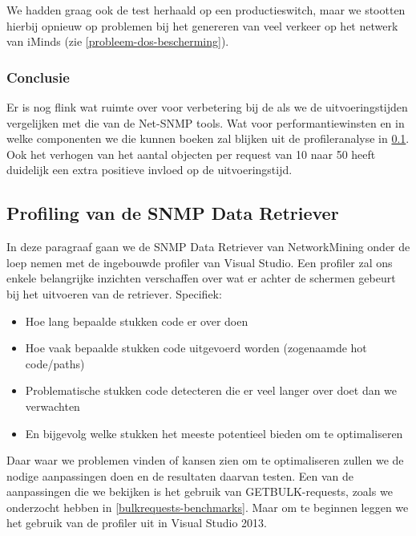We hadden graag ook de test herhaald op een productieswitch,
maar we stootten hierbij opnieuw op problemen bij het genereren van veel verkeer op het netwerk van iMinds (zie \cref{probleem-dos-bescherming}).


\subsubsection{Conclusie}

Er is nog flink wat ruimte over voor verbetering bij de \nwmretriever{} als we de uitvoeringstijden vergelijken met die van de Net-SNMP tools.
Wat voor performantiewinsten en in welke componenten we die kunnen boeken zal blijken uit de profileranalyse in \cref{profiling}.
Ook het verhogen van het aantal objecten per request van 10 naar 50 heeft duidelijk een extra positieve invloed op de uitvoeringstijd.

\subsection{Profiling van de SNMP Data Retriever}
\label{profiling}


In deze paragraaf gaan we de SNMP Data Retriever van NetworkMining onder de loep nemen met de ingebouwde profiler van Visual Studio.
Een profiler zal ons enkele belangrijke inzichten verschaffen over wat er achter de schermen gebeurt bij het uitvoeren van de retriever.
Specifiek:

\begin{itemize}
	\item Hoe lang bepaalde stukken code er over doen
	\item Hoe vaak bepaalde stukken code uitgevoerd worden (zogenaamde hot code/paths)
	\item Problematische stukken code detecteren die er veel langer over doet dan we verwachten
	\item En bijgevolg welke stukken het meeste potentieel bieden om te optimaliseren
\end{itemize}

Daar waar we problemen vinden of kansen zien om te optimaliseren zullen we de nodige aanpassingen doen en de resultaten daarvan testen.
Een van de aanpassingen die we bekijken is het gebruik van GETBULK-requests, zoals we onderzocht hebben in \cref{bulkrequests-benchmarks}.
Maar om te beginnen leggen we het gebruik van de profiler uit in Visual Studio 2013.

